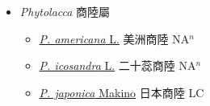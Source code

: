 
  \begin{itemize}
 \item[] \textit{Phytolacca} 商陸屬
                    
  \begin{itemize}
        \item[] \href{http://www.theplantlist.org/tpl1.1/search?q=Phytolacca+americana}{\textit{P. americana} L.}   美洲商陸 NA$^n$
        \item[] \href{http://www.theplantlist.org/tpl1.1/search?q=Phytolacca+icosandra}{\textit{P. icosandra} L.}   二十蕊商陸 NA$^n$
        \item[] \href{http://www.theplantlist.org/tpl1.1/search?q=Phytolacca+japonica}{\textit{P. japonica} Makino}   日本商陸 LC
  \end{itemize}
  \end{itemize}
